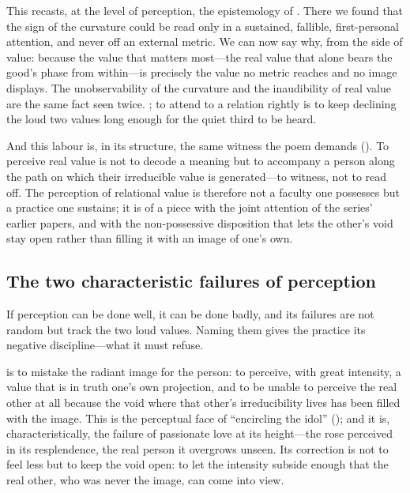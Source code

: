 This recasts, at the level of perception, the epistemology of . There we found that the sign of the curvature could be read only in a sustained, fallible, first-personal attention, and never off an external metric. We can now say why, from the side of value: because the value that matters most---the real value that alone bears the good's phase from within---is precisely the value no metric reaches and no image displays. The unobservability of the curvature and the inaudibility of real value are the same fact seen twice. ; to attend to a relation rightly is to keep declining the loud two values long enough for the quiet third to be heard.

And this labour is, in its structure, the same witness the poem demands (). To perceive real value is not to decode a meaning but to accompany a person along the path on which their irreducible value is generated---to witness, not to read off. The perception of relational value is therefore not a faculty one possesses but a practice one sustains; it is of a piece with the joint attention of the series' earlier papers, and with the non-possessive disposition that lets the other's void stay open rather than filling it with an image of one's own.

\subsection{The two characteristic failures of perception}
\label{p09:sec:perception-failures}

If perception can be done well, it can be done badly, and its failures are not random but track the two loud values. Naming them gives the practice its negative discipline---what it must refuse.

 is to mistake the radiant image for the person: to perceive, with great intensity, a value that is in truth one's own projection, and to be unable to perceive the real other at all because the void where that other's irreducibility lives has been filled with the image. This is the perceptual face of ``encircling the idol'' (); and it is, characteristically, the failure of passionate love at its height---the rose perceived in its resplendence, the real person it overgrows unseen. Its correction is not to feel less but to keep the void open: to let the intensity subside enough that the real other, who was never the image, can come into view.

